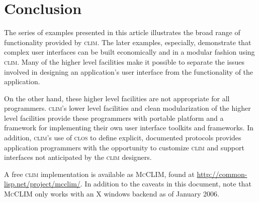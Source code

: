 \documentclass[twocolumn,a4paper]{article}
\newcommand {\code}[1]{{\sffamily #1}}
\newcommand {\CLIM}{\textsc{clim}}
\newcommand {\CLOS}{\textsc{clos}}
\newcommand {\mcclim}{\textsc{McCLIM}}
\let\method\code
\let\constant\code
\begin{document}
% 

\section{Conclusion}

The series of examples presented in this article illustrates the broad
range of functionality provided by \CLIM{}. The later examples,
especially, demonstrate that complex user interfaces can be built
economically and in a modular fashion using \CLIM{}. Many of the higher level
facilities make it possible to separate the issues involved in
designing an application's user interface from the functionality of
the application.

On the other hand, these higher level facilities are not
appropriate for all programmers. \CLIM{}'s lower level facilities and clean
modularization of the higher level facilities provide these programmers with
portable platform and a framework for implementing their own user
interface toolkits and frameworks. In addition, \CLIM{}'s use of \CLOS{}
to define explicit, documented protocols provides application
programmers with the opportunity to customize \CLIM{} and support
interfaces not anticipated by the \CLIM{} designers.

A free \CLIM{} implementation is available as \mcclim{}, found at
\url{http://common-lisp.net/project/mcclim/}. In addition to the
caveats in this document, note that \mcclim{} only works with an X
windows backend as of January 2006.
\end{document}
